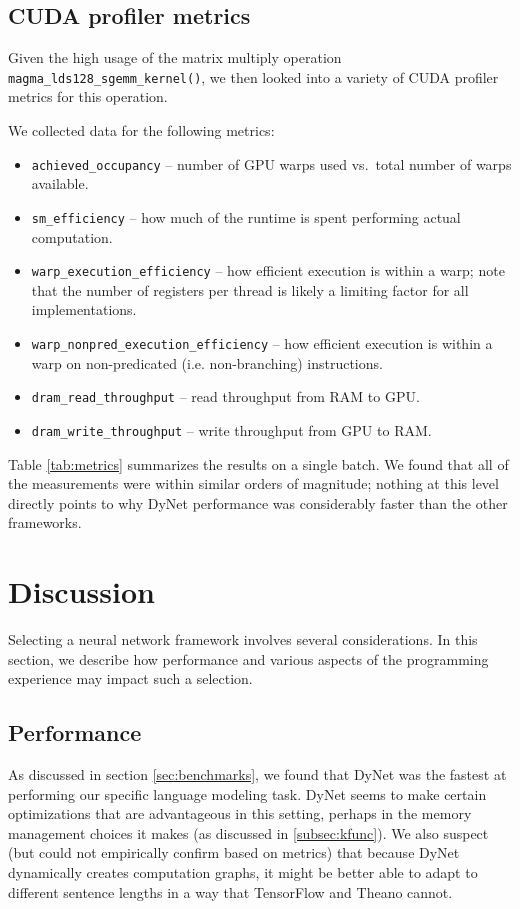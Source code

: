 \documentclass{article}
\begin{document}
\subsection{CUDA profiler metrics}
\label{subsec:cudaprof}

Given the high usage of the matrix multiply operation \verb!magma_lds128_sgemm_kernel()!, we
then looked into a variety of CUDA profiler metrics for this operation.

We collected data for the following metrics:
\begin{itemize}
\item \verb!achieved_occupancy! -- number of GPU warps used vs.\ total number of warps available.
\item \verb!sm_efficiency! -- how much of the runtime is spent performing actual computation.
\item \verb!warp_execution_efficiency! -- how efficient execution is within a warp; note that the number of registers per thread is likely a limiting factor for all implementations.
\item \verb!warp_nonpred_execution_efficiency! -- how efficient execution is within a warp on non-predicated (i.e. non-branching) instructions.
\item \verb!dram_read_throughput! -- read throughput from RAM to GPU.
\item \verb!dram_write_throughput! -- write throughput from GPU to RAM.
\end{itemize}

Table \ref{tab:metrics} summarizes the results on a single batch. We found that all of the measurements were within similar orders of magnitude; nothing at this level directly points to why DyNet performance was considerably faster than the other frameworks.

\section{Discussion}

Selecting a neural network framework involves several considerations. In this section, we describe how performance and various aspects of the programming experience may impact such a selection.

\subsection{Performance}

As discussed in section \ref{sec:benchmarks}, we found that DyNet was the fastest at performing our specific language modeling task.
DyNet seems to make certain optimizations that are advantageous in this setting, perhaps in the memory management choices it makes (as discussed in \ref{subsec:kfunc}). We also suspect (but could not empirically confirm based on metrics) that because DyNet dynamically creates computation graphs, it might be better able to adapt to different sentence lengths in a way that TensorFlow and Theano cannot.
\end{document}
